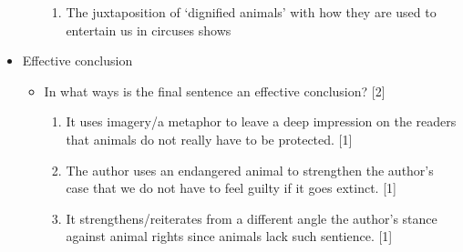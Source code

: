 \documentclass[oneside]{book}
\begin{document}
\begin{itemize}
\begin{itemize}
\begin{enumerate}[label=(\alph*)]
            \item The juxtaposition of `dignified animals' with how they are used to entertain us in circuses shows 
        \end{enumerate}
    \end{itemize}
    \item Effective conclusion
    \begin{itemize}
        \item In what ways is the final sentence an effective conclusion? [2]
        \begin{enumerate}[label=(\alph*)]
            \item It uses imagery/a metaphor to leave a deep impression on the readers that animals do not really have to be protected. [1]
            \item The author uses an endangered animal to strengthen the author's case that we do not have to feel guilty if it goes extinct. [1]
            \item It strengthens/reiterates from a different angle the author's stance against animal rights since animals lack such sentience. [1]
        \end{enumerate}
    \end{itemize}
\end{itemize}
\end{document}
